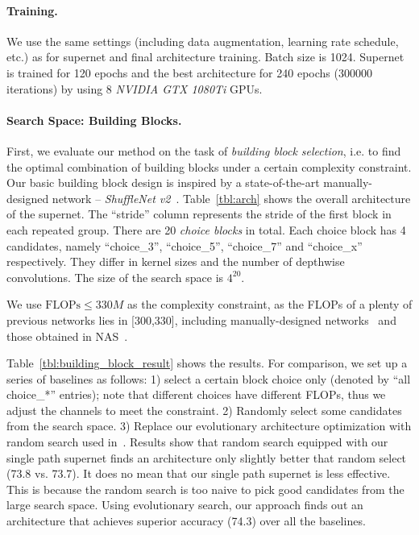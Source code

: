 \paragraph{Training.} We use the same settings (including data augmentation, learning rate schedule, etc.) as \cite{ma2018shufflenet} for supernet and final architecture training. Batch size is 1024. Supernet is trained for 120 epochs and the best architecture for 240 epochs (300000 iterations) by using 8 \emph{NVIDIA GTX 1080Ti} GPUs.

\paragraph{Search Space: Building Blocks. } First, we evaluate our method on the task of \emph{building block selection}, i.e. to find the optimal combination of building blocks under a certain complexity constraint. Our basic building block design is inspired by a state-of-the-art manually-designed network -- \emph{ShuffleNet v2}~\cite{ma2018shufflenet}. Table~\ref{tbl:arch} shows the overall architecture of the supernet. The ``stride'' column represents the stride of the first block in each repeated group. There are 20 \emph{choice blocks} in total. Each choice block has 4 candidates, namely ``choice\_3'', ``choice\_5'', ``choice\_7'' and ``choice\_x'' respectively. They differ in kernel sizes and the number of depthwise convolutions. The size of the search space is $4^{20}$. 

\label{sec:buildingblock}

We use $ \text{FLOPs} \le 330M $ as the complexity constraint, as the FLOPs of a plenty of previous networks lies in [300,330], including manually-designed networks~\cite{howard2017mobilenets,sandler2018mobilenetv2,zhang2018shufflenet,ma2018shufflenet} and those obtained in NAS~\cite{cai2018proxylessnas,wu2018fbnet,tan2018mnasnet}.

Table~\ref{tbl:building_block_result} shows the results. For comparison, we set up a series of baselines as follows: 1) select a certain block choice only (denoted by ``all choice\_*'' entries); note that different choices have different FLOPs, thus we adjust the channels to meet the constraint. 2) Randomly select some candidates from the search space. 3) Replace our evolutionary architecture optimization with random search used in~\cite{brock2017smash,bender2018understanding}. Results show that random search equipped with our single path supernet finds an architecture only slightly better that random select (73.8 vs. 73.7). It does no mean that our single path supernet is less effective. This is because the random search is too naive to pick good candidates from the large search space. Using evolutionary search, our approach finds out an architecture that achieves superior accuracy (74.3) over all the baselines.

